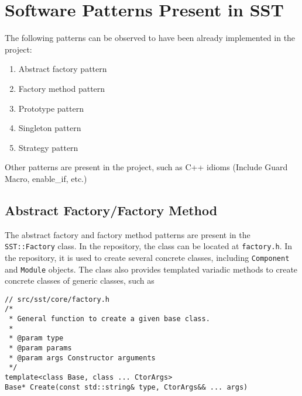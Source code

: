 



\section{Software Patterns Present in SST}
The following patterns can be observed to have been already implemented in the project:
\begin{enumerate}
    \item Abstract factory pattern
    \item Factory method pattern
    \item Prototype pattern
    \item Singleton pattern
    \item Strategy pattern
\end{enumerate}
Other patterns are present in the project, such as C++ idioms (Include Guard Macro, enable\_if, etc.)

\subsection{Abstract Factory/Factory Method}
The abstract factory and factory method patterns are present in the \texttt{SST::Factory} class. In the repository, the class can be located at \texttt{factory.h}. In the repository, it is used to create several concrete classes, including \texttt{Component} and \texttt{Module} objects. The class also provides templated variadic methods to create concrete classes of generic classes, such as
\begin{lstlisting}[style=customC++,label=af,caption=Abstract Factory]
// src/sst/core/factory.h
/*
 * General function to create a given base class.
 *
 * @param type
 * @param params
 * @param args Constructor arguments
 */
template<class Base, class ... CtorArgs>
Base* Create(const std::string& type, CtorArgs&& ... args)
\end{lstlisting}


